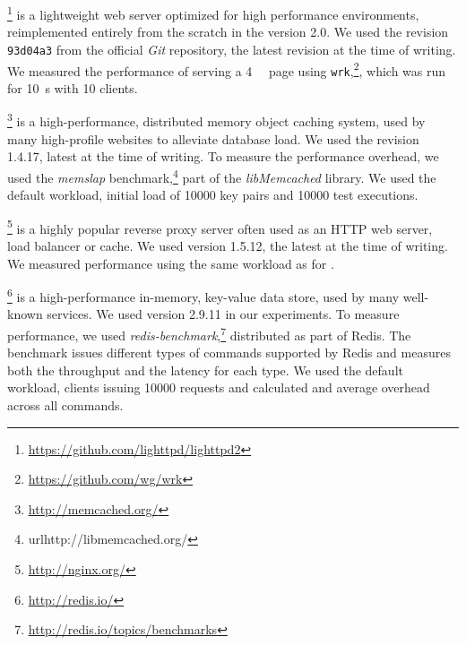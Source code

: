 \boldtext{\lighttpdtwo}\footnote{\url{https://github.com/lighttpd/lighttpd2}}
is a lightweight web server optimized for high performance environments,
reimplemented entirely from the scratch in the version 2.0.  We used the
revision \lstinline`93d04a3` from the official \textit{Git} repository, the
latest revision at the time of writing. We measured the performance of serving
a \SI{4}{\kilo\byte} page using
\lstinline`wrk`,\footnote{\url{https://github.com/wg/wrk}}, which was run for
\SI{10}{\second} with \num{10} clients.


\boldtext{\memcached}\footnote{\url{http://memcached.org/}} 
is a high-performance, distributed memory object caching system, used by
many high-profile websites to alleviate database load. We used the
revision 1.4.17, latest at the time of writing. To measure the performance
overhead, we used the \emph{memslap} benchmark,\footnote{url{http://libmemcached.org/}}
part of the \emph{libMemcached} library. We used the default workload,
\ie initial load of \num{10000} key pairs and \num{10000} test executions.


\footnote{\url{http://nginx.org/}}
is a highly popular reverse proxy server often used as an HTTP web
server, load balancer or cache. We used version 1.5.12, the
latest at the time of writing.  We measured
performance using the same workload as for \lighttpdtwo.


\boldtext{\redis}\footnote{\url{http://redis.io/}}
is a high-performance in-memory, key-value data store, used by many
well-known services. %
We used version 2.9.11 in our experiments.  To measure
performance, we used
\emph{redis-benchmark},\footnote{\url{http://redis.io/topics/benchmarks}}
distributed as part of Redis. The benchmark issues different types
of commands supported by Redis and measures both the throughput and
the latency for each type. We used the default workload, 
clients issuing \num{10000} requests and calculated and average overhead
across all commands. 

